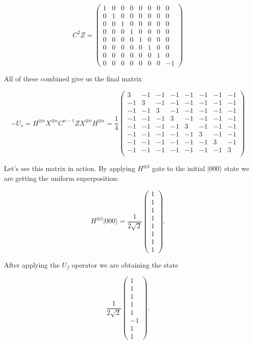 \[ C^2 Z = \begin{pmatrix}
1 & 0 & 0 & 0 & 0 & 0 & 0 & 0 \\
0 & 1 & 0 & 0 & 0 & 0 & 0 & 0 \\
0 & 0 & 1 & 0 & 0 & 0 & 0 & 0 \\
0 & 0 & 0 & 1 & 0 & 0 & 0 & 0 \\
0 & 0 & 0 & 0 & 1 & 0 & 0 & 0 \\
0 & 0 & 0 & 0 & 0 & 1 & 0 & 0 \\
0 & 0 & 0 & 0 & 0 & 0 & 1 & 0 \\
0 & 0 & 0 & 0 & 0 & 0 & 0 & -1
\end{pmatrix} \]

All of these combined give us the final matrix

\[ -U_s = H^{\otimes n} X^{\otimes n} C^{n-1}Z X^{\otimes n} H^{\otimes n} = \frac{1}{4}\begin{pmatrix}
3 & -1 & -1 & -1 & -1 & -1 & -1 & -1 \\
-1 & 3 & -1 & -1 & -1 & -1 & -1 & -1 \\
-1 & -1 & 3 & -1 & -1 & -1 & -1 & -1 \\
-1 & -1 & -1 & 3 & -1 & -1 & -1 & -1 \\
-1 & -1 & -1 & -1 & 3 & -1 & -1 & -1 \\
-1 & -1 & -1 & -1 & -1 & 3 & -1 & -1 \\
-1 & -1 & -1 & -1 & -1 & -1 & 3 & -1 \\
-1 & -1 & -1 & -1 & -1 & -1 & -1 & 3 \\
\end{pmatrix} \]

Let's see this matrix in action. By applying $H^{\otimes 3}$ gate to the initial $|000\rangle$ state we are getting the uniform superposition:

\[ H^{\otimes 3} |000\rangle = \frac{1}{2\sqrt{2}}\begin{pmatrix}
1 \\ 1 \\ 1 \\ 1 \\ 1 \\ 1 \\ 1 \\ 1
\end{pmatrix}.\]

After applying the $U_f$ operator we are obtaining the state

\[ \frac{1}{2\sqrt{2}}\begin{pmatrix}
1 \\ 1 \\ 1 \\ 1 \\ 1 \\ -1 \\ 1 \\ 1
\end{pmatrix}.\]

